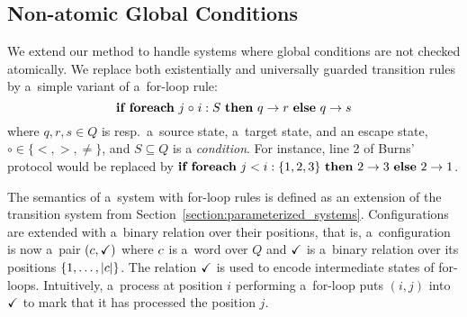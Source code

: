 
\subsection{Non-atomic Global Conditions} \label{section:non-atomic}
We extend our method to handle systems where global conditions are not checked atomically.
%
We replace both existentially and universally guarded transition rules by a~simple variant of a~for-loop rule:
$$%
\forrule q r \circ S s%
$$
where $q,r,s\in Q$ is resp.\ a~source state, a~target state, and an
escape state, $\circ\in\{<,>,\neq\}$, and $S\subseteq Q$ is a
\emph{condition}.
%
For instance, line 2 of Burns' protocol would be replaced by
$
\forrule 2 3 < {\{1,2,3\}} 1
$.


The semantics of a~system with for-loop rules is defined as an
extension of the transition system from
Section~\ref{section:parameterized_systems}.  Configurations are
extended with a~binary relation over their positions, that is,
a~configuration is now a~pair $(c,\checkmark)$ where $c$ is a~word
over $Q$ and $\checkmark$ is a~binary relation over its positions
$\{1,\ldots,|c|\}$.
%
The relation $\checkmark$ is used to encode intermediate states of
for-loops. Intuitively, a~process at position $i$ performing
a~for-loop puts $(i,j)$ into $\checkmark$ to mark that it has processed the
position $j$.

